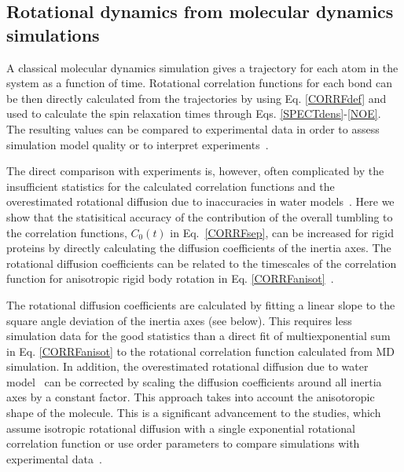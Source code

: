 \documentclass[pre,aps,floatfix,authordate1-4,twocolumn]{revtex4-1}
\begin{document}
\subsection{Rotational dynamics from molecular dynamics simulations}\label{MDanalysis}
A classical molecular dynamics simulation gives a trajectory for each atom in
the system as a function of time. Rotational correlation functions for each bond
can be then directly calculated from the trajectories by using Eq. \ref{CORRFdef}
and used to calculate the spin relaxation times through Eqs. \ref{SPECTdens}-\ref{NOE}.
The resulting values can be compared to experimental data in order to assess simulation model
quality \cite{best04,showalter07a,showalter07b,maragakis08,trbovic08,fisette12} or
to interpret experiments~\cite{fisette12}.

The direct comparison with experiments is, however, often complicated by
the insufficient statistics for the calculated correlation functions and the overestimated
rotational diffusion due to inaccuracies in water models~\cite{wong08,anderson12}.
Here we show that the statisitical accuracy of the contribution of the
overall tumbling to the correlation functions, $C_0(t)$ in Eq.~\ref{CORRFsep}, can be increased for
rigid proteins by directly calculating the diffusion coefficients of the inertia axes.
The rotational diffusion coefficients can be related to the timescales
of the correlation function for anisotropic rigid body rotation
in Eq. \ref{CORRFanisot}~\cite{woessner62,Note1}.

The rotational diffusion coefficients are calculated by fitting a linear slope to the 
square angle deviation of the inertia axes (see below). This requires less simulation data
for the good statistics than a direct fit of multiexponential sum in Eq. \ref{CORRFanisot}
to the rotational correlation function calculated from MD simulation.
In addition, the overestimated rotational diffusion due to water model~\cite{wong08} can
be corrected by scaling the diffusion coefficients around all inertia axes
by a constant factor. This approach takes into account the anisotoropic shape of
the molecule. This is a significant advancement to the studies, which assume
isotropic rotational diffusion with a single exponential rotational correlation
function \cite{showalter07a,showalter07b,maragakis08,gu14,allner15} or
use order parameters to compare simulations with experimental data~\cite{gu14,maragakis08,trbovic08,best04}.
\end{document}
